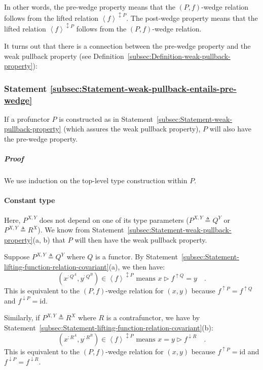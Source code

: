 In other words, the pre-wedge property means that the $\left(P,f\right)$-wedge
relation follows from the lifted relation $\left<f\right>^{\updownarrow P}$.
The post-wedge property means that the lifted relation $\left<f\right>^{\updownarrow P}$
follows from the $\left(P,f\right)$-wedge relation.

It turns out that there is a connection between the pre-wedge property
and the weak pullback property (see Definition~\ref{subsec:Definition-weak-pullback-property}):

\subsubsection{Statement \label{subsec:Statement-weak-pullback-entails-pre-wedge}\ref{subsec:Statement-weak-pullback-entails-pre-wedge}}

If a profunctor $P$ is constructed as in Statement~\ref{subsec:Statement-weak-pullback-property}
(which assures the weak pullback property), $P$ will also have the
pre-wedge property.

\subparagraph{Proof}

We use induction on the top-level type construction within $P$.

\paragraph{Constant type}

Here, $P^{X,Y}$ does not depend on one of its type parameters ($P^{X,Y}\triangleq Q^{Y}$
or $P^{X,Y}\triangleq R^{X}$). We know from Statement~\ref{subsec:Statement-weak-pullback-property}(a,
b) that $P$ will then have the weak pullback property.

Suppose $P^{X,Y}\triangleq Q^{Y}$ where $Q$ is a functor. By Statement~\ref{subsec:Statement-lifting-function-relation-covariant}(a),
we then have:
\[
(x^{:Q^{A}},y^{:Q^{B}})\in\left<f\right>^{\updownarrow P}\text{ means }x\triangleright f^{\uparrow Q}=y\quad.
\]
This is equivalent to the $\left(P,f\right)$-wedge relation for $(x,y)$
because $f^{\uparrow P}=f^{\uparrow Q}$ and $f^{\downarrow P}=\text{id}$.

Similarly, if $P^{X,Y}\triangleq R^{X}$ where $R$ is a contrafunctor,
we have by Statement~\ref{subsec:Statement-lifting-function-relation-covariant}(b):
\[
(x^{:R^{A}},y^{:R^{B}})\in\left<f\right>^{\updownarrow P}\text{ means }x=y\triangleright f^{\downarrow R}\quad.
\]
This is equivalent to the $\left(P,f\right)$-wedge relation for $(x,y)$
because $f^{\uparrow P}=\text{id}$ and $f^{\downarrow P}=f^{\downarrow R}$.

